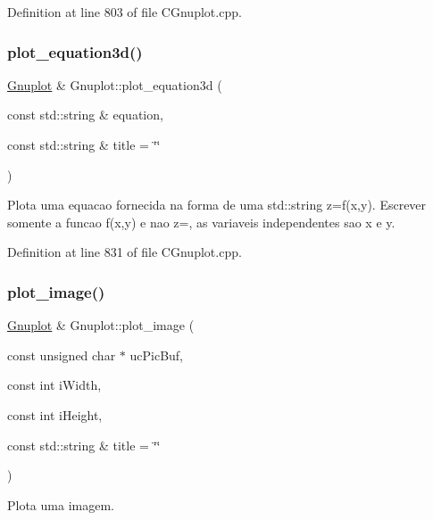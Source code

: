 Definition at line 803 of file C\+Gnuplot.\+cpp.

\mbox{\label{class_gnuplot_a79aed3a6927f7d1d3497cba441e8a943}} 
\subsubsection{\texorpdfstring{plot\+\_\+equation3d()}{plot\_equation3d()}}
{\footnotesize\ttfamily \hyperlink{class_gnuplot}{Gnuplot} \& Gnuplot\+::plot\+\_\+equation3d (\begin{DoxyParamCaption}\item[{const std\+::string \&}]{equation,  }\item[{const std\+::string \&}]{title = {\ttfamily \char`\"{}\char`\"{}} }\end{DoxyParamCaption})}



Plota uma equacao fornecida na forma de uma std\+::string z=f(x,y). Escrever somente a funcao f(x,y) e nao z=, as variaveis independentes sao x e y. 



Definition at line 831 of file C\+Gnuplot.\+cpp.

\mbox{\label{class_gnuplot_ab71117b8fa74d53ea20c313717d86b5c}} 
\subsubsection{\texorpdfstring{plot\+\_\+image()}{plot\_image()}}
{\footnotesize\ttfamily \hyperlink{class_gnuplot}{Gnuplot} \& Gnuplot\+::plot\+\_\+image (\begin{DoxyParamCaption}\item[{const unsigned char $\ast$}]{uc\+Pic\+Buf,  }\item[{const int}]{i\+Width,  }\item[{const int}]{i\+Height,  }\item[{const std\+::string \&}]{title = {\ttfamily \char`\"{}\char`\"{}} }\end{DoxyParamCaption})}



Plota uma imagem. 


